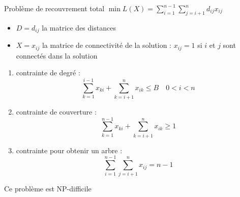 \documentclass[a4paper,11pt]{thesis}
\begin{document}
Problème de recouvrement total $\min L(X) = \sum_{i=1}^{n-1} \sum_{j=i+1}^{n} d_{ij}x_{ij}$ \begin{itemize}
    \item $D = d_{ij}$ la matrice des distances
\item $X = x_{ij}$ la matrice de connectivité de la
solution : $x_{ij} = 1$ si $i$ et $j$ sont connectés dans la solution
\end{itemize}{\begin{enumerate}
    \item contrainte de degré :
        \begin{displaymath}
            \sum_{k = 1}^{i-1} x_{ki} + \sum_{k=i+1}^n x_{ik} \leq B \quad 0 < i < n
        \end{displaymath}
    \item contrainte de couverture :
        \begin{displaymath}
            \sum_{k=1}^{n-1}x_{ki} + \sum_{k=i+1}^n x_{ik} \geq 1
        \end{displaymath}
    \item contrainte pour obtenir un arbre :
        \begin{displaymath}
            \sum_{i=1}^{n-1} \sum_{j=i+1}^n x_{ij} = n-1
        \end{displaymath}
\end{enumerate}



\begin{prop}
    Ce problème est NP-difficile
\end{prop}

}
\end{document}

